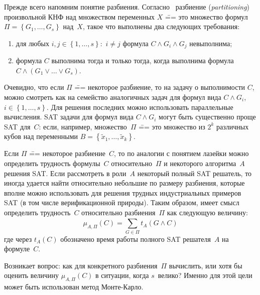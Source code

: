 Прежде всего напомним понятие разбиения.
Согласно~\cite{hyvarinen2011} разбиение (\textit{partitioning}) произвольной КНФ над множеством переменных $X$ \=== это множество формул $\Pi = \left\{ G_{1},\ldots,G_{s} \right\}$ над~$X$, такое что выполнены два следующих требования:

\begin{enumerate}
\item
  для любых $i,j \in \left\{ 1,\ldots,s \right\}:$ $i \neq j$ формула $C \land G_{i} \land G_{j}$ невыполнима;
\item
  формула $C$ выполнима тогда и только тогда, когда выполнима формула $C \land \left( G_{1} \lor \ldots \lor G_{s} \right)$.
\end{enumerate}

Очевидно, что если $\Pi$ \=== некоторое разбиение, то на задачу о выполнимости $C$, можно смотреть как на семейство аналогичных задач для формул вида $C \land G_{i}$, $i \in \left\{ 1,\ldots,s \right\}$.
Для решения последних можно использовать параллельные вычисления.
SAT задачи для формул вида $C \land G_{i}$ могут быть существенно проще SAT для~$C$: если, например, множество~$\Pi$ \=== это множество из $2^{k}$ различных кубов над переменными $B = \left\{ {\widetilde{x}}_{1},\ldots,{\widetilde{x}}_{k} \right\}$.

Если $\Pi$ \=== некоторое разбиение~$C$, то по аналогии с понятием лазейки можно определить трудность формулы~$C$ относительно~$\Pi$ и некоторого алгоритма~$A$ решения SAT.
Если рассмотреть в роли~$A$ некоторый полный SAT решатель, то иногда удается найти относительно небольшие по размеру разбиения, которые вполне можно использовать для решения трудных индустриальных примеров SAT (в том числе верификационной природы).
Таким образом, имеет смысл определить трудность~$C$ относительно разбиения~$\Pi$ как следующую величину:
\[
    \mu_{A,\Pi}(C) = \sum_{G \in \Pi}^{}{t_{A}(G \land C)}
\]
где через $t_{A}(C)$ обозначено время работы полного SAT решателя~$A$ на формуле~$C$.

Возникает вопрос: как для конкретного разбиения~$\Pi$ вычислить, или хотя бы оценить величину $\mu_{A,\Pi}(C)$ в ситуации, когда $s$~велико?
Именно для этой цели может быть использован метод Монте-Карло.


